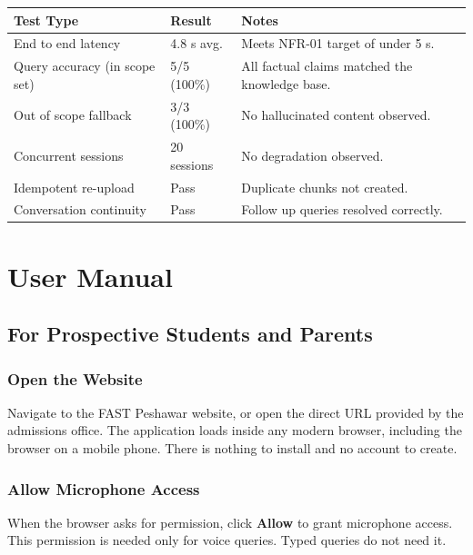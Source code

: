 \documentclass[12pt,a4paper]{report}
\begin{document}
\begin{table}[H]
  \centering
  \begin{tabular}{p{5cm} p{3cm} p{5cm}}
    \toprule
    \textbf{Test Type}              & \textbf{Result} & \textbf{Notes} \\
    \midrule
    End to end latency              & 4.8 s avg.      & Meets NFR-01 target of under 5 s. \\
    Query accuracy (in scope set)   & 5/5 (100\%)     & All factual claims matched the knowledge base. \\
    Out of scope fallback           & 3/3 (100\%)     & No hallucinated content observed. \\
    Concurrent sessions             & 20 sessions     & No degradation observed. \\
    Idempotent re-upload            & Pass            & Duplicate chunks not created. \\
    Conversation continuity         & Pass            & Follow up queries resolved correctly. \\
    \bottomrule
  \end{tabular}
\end{table}

\newpage
\section{User Manual}

\subsection{For Prospective Students and Parents}

\subsubsection{Open the Website}
Navigate to the FAST Peshawar website, or open the direct URL provided
by the admissions office. The application loads inside any modern
browser, including the browser on a mobile phone. There is nothing to
install and no account to create.

\subsubsection{Allow Microphone Access}
When the browser asks for permission, click \textbf{Allow} to grant
microphone access. This permission is needed only for voice queries.
Typed queries do not need it.
\end{document}
